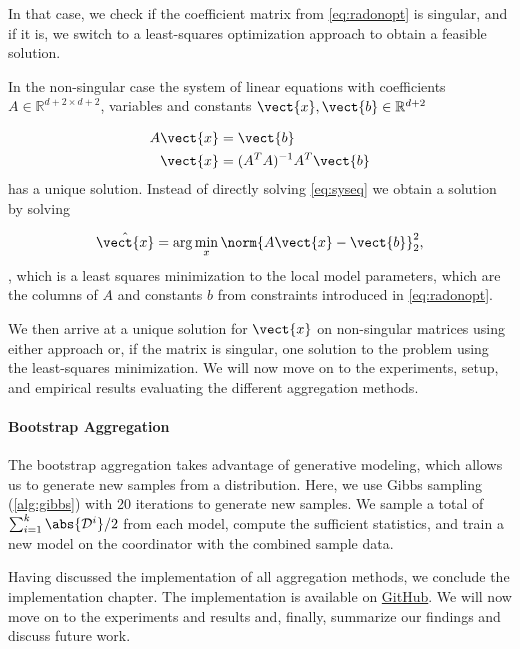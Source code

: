 In that case, we check if the coefficient matrix from \autoref{eq:radonopt} is singular, and if it is, we switch to a least-squares optimization approach to obtain a feasible solution. 

In the non-singular case the system of linear equations with coefficients $A \in \mathbb{R}^{d+2 \times d+2}$, variables and constants $\vect{x}, \vect{b} \in \mathbb{R}^{d+2}$

\begin{equation}
    \label{eq:syseq}
    \begin{split}
        A\vect{x} &= \vect{b} \\
        \vect{x} &= (A^TA)^{-1}A^T \vect{b}
    \end{split}
\end{equation}
has a unique solution.
Instead of directly solving \autoref{eq:syseq} we obtain a solution by solving 

\begin{equation}
    \hat{\vect{x}} = \arg\min_{x} \norm{A\vect{x} - \vect{b}}^2_2,
\end{equation}
, which is a least squares minimization \wrt to the local model parameters, which are the columns of $A$ and constants $b$ from constraints introduced in \autoref{eq:radonopt}.

We then arrive at a unique solution for $\vect{x}$ on non-singular matrices using either approach or, if the matrix is singular, one solution to the problem using the least-squares minimization.
We will now move on to the experiments, setup, and empirical results evaluating the different aggregation methods.


\paragraph*{Bootstrap Aggregation}

The bootstrap aggregation takes advantage of generative modeling, which allows us to generate new samples from a distribution.
Here, we use Gibbs sampling (\autoref{alg:gibbs}) with 20 iterations to generate new samples.
We sample a total of $\sum_{i=1}^k \abs{\mathcal{D}^i} /2$ from each model, compute the sufficient statistics, and train a new model on the coordinator with the combined sample data.

\hypersetup{pdfborder=1 1 1}
Having discussed the implementation of all aggregation methods, we conclude the implementation chapter.
The implementation is available on \href{https://github.com/Xst4r/Distributed-PGM/tree/master/Code}{GitHub}.
We will now move on to the experiments and results and, finally, summarize our findings and discuss future work.
\hypersetup{hidelinks}